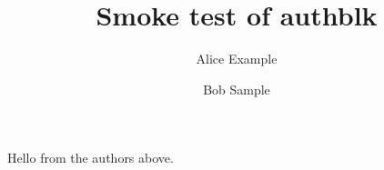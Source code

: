 \documentclass{article}
\title{Smoke test of authblk}
\author[1]{Alice Example}
\author[2]{Bob Sample}
\affil[1]{Department of Testing, Example University}
\affil[2]{Institute of Samples}
\begin{document}
\maketitle
Hello from the authors above.
\end{document}

